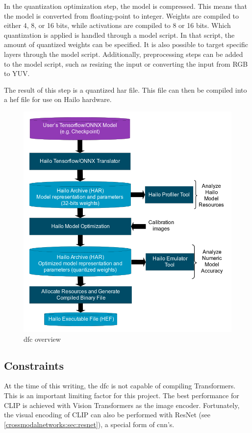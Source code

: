 In the quantization optimization step, the model is compressed.  
This means that the model is converted from floating-point to integer.  
Weights are compiled to either 4, 8, or 16 bits, while activations are compiled to 8 or 16 bits.  
Which quantization is applied is handled through a model script.  
In that script, the amount of quantized weights can be specified.  
It is also possible to target specific layers through the model script.  
Additionally, preprocessing steps can be added to the model script, such as resizing the input or converting the input from RGB to YUV.  

The result of this step is a quantized \acrshort{har} file.  
This file can then be compiled into a \acrshort{hef} file for use on Hailo hardware.  

\begin{figure}[!h]
    \centering
    \includegraphics[width=\textwidth]{Images/Hardware/model_build_overview_with_onnx_and_hef_w_har.png}
    \caption{\Acrlong{dfc} overview \cite{hailo_dataflow_compiler}}
    \label{fig:hardware:dfcoverview}
\end{figure}

\subsection{Constraints}
At the time of this writing, the \acrshort{dfc} is not capable of compiling Transformers.  
This is an important limiting factor for this project.  
The best performance for CLIP is achieved with Vision Transformers as the image encoder.  
Fortunately, the visual encoding of CLIP can also be performed with ResNet (see \cref{crossmodalnetworks:sec:resnet}), a special form of \acrshort{cnn}'s.  

